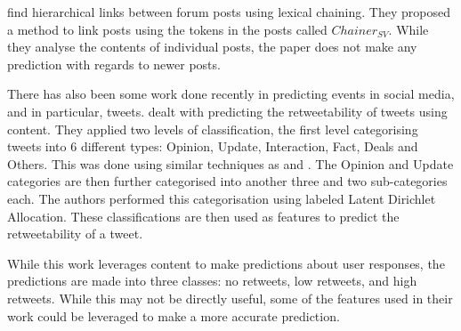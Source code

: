  find hierarchical links between forum posts using lexical 
chaining.  They proposed a method to link posts using the tokens in the posts 
called $Chainer_{SV}$. While they analyse the contents of individual posts, the 
paper does not make any prediction with regards to newer posts.


There has also been some work done recently in predicting events in social 
media, and in particular, tweets.   dealt with predicting the 
retweetability of tweets using content. They applied two levels of 
classification, the first level categorising tweets into 6 different types: 
Opinion, Update, Interaction, Fact, Deals and Others. This was done using 
similar techniques as  and . The Opinion 
and Update categories are then further categorised into another three and two 
sub-categories each. The authors performed this categorisation using labeled 
Latent Dirichlet Allocation. These classifications are then used as features to 
predict the retweetability of a tweet. 

While this work leverages content to make predictions about user responses, the 
predictions are made into three classes: no retweets, low retweets, and high 
retweets. While this may not be directly useful, some of the features used in 
their work could be leveraged to make a more accurate prediction.




